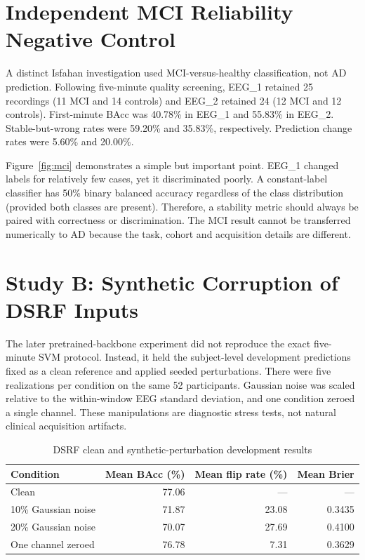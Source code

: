 \section{Independent MCI Reliability Negative Control}
A distinct Isfahan investigation used MCI-versus-healthy classification, not AD prediction. Following five-minute quality screening, EEG\_1 retained 25 recordings (11 MCI and 14 controls) and EEG\_2 retained 24 (12 MCI and 12 controls). First-minute BAcc was 40.78\% in EEG\_1 and 55.83\% in EEG\_2. Stable-but-wrong rates were 59.20\% and 35.83\%, respectively. Prediction change rates were 5.60\% and 20.00\%.


Figure~\ref{fig:mci} demonstrates a simple but important point. EEG\_1 changed labels for relatively few cases, yet it discriminated poorly. A constant-label classifier has 50\% binary balanced accuracy regardless of the class distribution (provided both classes are present). Therefore, a stability metric should always be paired with correctness or discrimination. The MCI result cannot be transferred numerically to AD because the task, cohort and acquisition details are different.

\section{Study B: Synthetic Corruption of DSRF Inputs}
The later pretrained-backbone experiment did not reproduce the exact five-minute SVM protocol. Instead, it held the subject-level development predictions fixed as a clean reference and applied seeded perturbations. There were five realizations per condition on the same 52 participants. Gaussian noise was scaled relative to the within-window EEG standard deviation, and one condition zeroed a single channel. These manipulations are diagnostic stress tests, not natural clinical acquisition artifacts.

\begin{table}[htbp]\centering\small
\caption{DSRF clean and synthetic-perturbation development results}\label{tab:robustness}
\begin{tabular}{@{}lrrr@{}}\toprule
\textbf{Condition}&\textbf{Mean BAcc (\%)}&\textbf{Mean flip rate (\%)}&\textbf{Mean Brier}\\\midrule
Clean&77.06&---&---\\
10\% Gaussian noise&71.87&23.08&0.3435\\
20\% Gaussian noise&70.07&27.69&0.4100\\
One channel zeroed&76.78&7.31&0.3629\\\bottomrule\end{tabular}\end{table}

